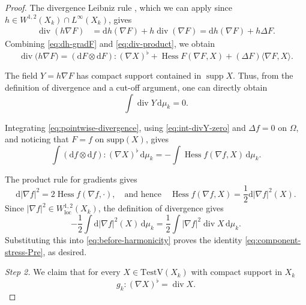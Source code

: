 \documentclass[12pt,a4paper,reqno]{amsart}
\newcommand{\TestV}{\mathrm{TestV}}
\newcommand{\Hess}{\operatorname{Hess}}
\newcommand{\supp}{\operatorname{supp}}
\begin{document}
\begin{proof}
The divergence Leibniz rule
\cite[Proposition~4.2(2)]{GigliViolo}, which we can apply since $h\in W^{1,2}(X_k)\cap L^\infty(X_k)$, gives
\begin{equation} \label{eq:div-product}
\begin{aligned}
 \operatorname{div}(h\nabla F)
 &=\mathrm{d}h(\nabla F)+h\operatorname{div}(\nabla F)=\mathrm{d}h(\nabla F)+h\Delta F.
\end{aligned}
\end{equation}
Combining \eqref{eq:dh-gradF} and \eqref{eq:div-product}, we obtain
\begin{equation}\label{eq:pointwise-divergence}
 \operatorname{div}\bigl(h\nabla F\bigr)
 =(\mathrm{d}F\otimes \mathrm{d}F):(\nabla X)^{\flat}
  +\Hess F(\nabla F,X)+(\Delta F)\langle \nabla F,X\rangle.
\end{equation}

The field $Y=h\nabla F$ has compact support contained in
$\supp X$. Thus,
from the definition of divergence \cite[Definition~2.3.11]{GigliNDG} and a cut-off argument, one can directly obtain
\begin{equation}\label{eq:int-divY-zero}
 \int\operatorname{div}Y\,\mathrm{d}\mu_k=0.
\end{equation}

Integrating \eqref{eq:pointwise-divergence}, using
\eqref{eq:int-divY-zero} and $\Delta f=0$ on $\Omega$, and noticing that $F=f$ on $\mathrm{supp}(X)$, gives
\begin{equation}\label{eq:before-harmonicity}
 \int(\mathrm{d}f\otimes \mathrm{d}f):(\nabla X)^{\flat}\,\mathrm{d}\mu_k
 =-\int\Hess f(\nabla f,X)\,\mathrm{d}\mu_k.
\end{equation}

The product rule for gradients
\cite[Proposition~3.3.22, (3.3.33)]{GigliNDG} gives
\[
 \mathrm{d}|\nabla f|^2=2\Hess f(\nabla f,\mathord\cdot), \quad \text{and hence} \quad  \Hess f(\nabla f,X)=\frac12\mathrm{d}|\nabla f|^2(X).
\]
Since $|\nabla f|^2\in W^{1,2}_{\mathrm{loc}}(X_k)$, the definition of
divergence gives
\[
 -\frac12\int \mathrm{d}|\nabla f|^2(X)\,\mathrm{d}\mu_k
 =\frac12\int|\nabla f|^2\operatorname{div}X\,\mathrm{d}\mu_k.
\]
Substituting this into \eqref{eq:before-harmonicity} proves the  identity \eqref{eq:component-stress-Pre}, as desired.
\medskip

\textit{Step 2.} We claim that for every $X\in\TestV(X_k)$ with compact support in $X_k$
\begin{equation}\label{eq:metric-divergence}
 g_k:(\nabla X)^{\flat}=\operatorname{div}X.
\end{equation}


\end{proof}
\end{document}
